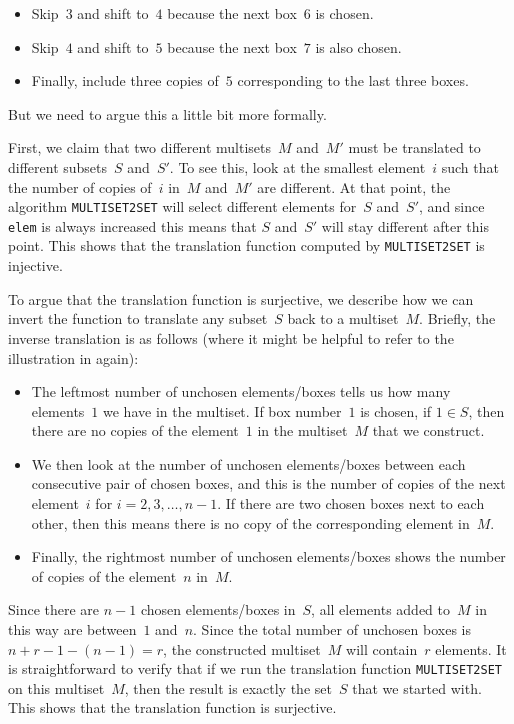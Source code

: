 \documentclass{jn-pset}
\begin{document}
\begin{problem}
\begin{solution}
\begin{itemize}
  \item
    Skip~$3$ and shift to~$4$
    because the next box~$6$ is chosen.
    
  \item
    Skip~$4$ and shift to~$5$
    because the next box~$7$ is also chosen.
    
  \item
    Finally, include three copies of~$5$
    corresponding to the last three boxes.
  \end{itemize}
%
  But we need to argue this a little bit more formally.

  First, we claim that two different multisets~$M$ and~$M'$
  must be translated to different subsets~$S$ and~$S'$.
  To see this, look at the smallest element~$i$
  such that the number of copies of~$i$ in~$M$ and~$M'$
  are different.
  At that point, the  algorithm
  \verb+MULTISET2SET+
  will select different elements for~$S$ and~$S'$,
  and since
  \verb+elem+ is always increased this means that
  $S$ and~$S'$
  will stay different after this point.
  This shows that the translation function computed by
  \verb+MULTISET2SET+
  is injective.

  To argue that the translation function is surjective,
  we describe how we can invert the function to  translate any
  subset~$S$ back to a multiset~$M$.
  Briefly, the inverse translation is as follows
  (where it might be helpful to refer to the illustration in
  again):
  \begin{itemize}
  \item
    The leftmost number of unchosen elements/boxes tells us how many elements~$1$ we
    have in the multiset.
    If box number~$1$ is chosen, \ie if
    $1 \in S$, then there are no copies of the element~$1$ in the
    multiset~$M$
    that we construct.
    
  \item
    We then look at the number of unchosen elements/boxes between each
    consecutive pair of chosen boxes,
    and this is the number of copies of the next element~$i$
    for
    $i = 2, 3, \ldots, n-1$.
    If there are two chosen boxes next to each other, then this means
    there is no copy of the corresponding element in~$M$.
 
    
  \item
    Finally, the rightmost number of unchosen elements/boxes
    shows the number of copies of the element~$n$ in~$M$.
    
  \end{itemize}
%
  Since there are $n-1$ chosen elements/boxes in~$S$, all elements
  added to~$M$ in this way are between~$1$ and~$n$.
  Since the total number of unchosen boxes is
  $
  n + r - 1 - (n-1) = r
  $,
  the constructed multiset~$M$ will contain~$r$ elements.
  It is straightforward to verify that if we run the translation function
  \verb+MULTISET2SET+
  on this multiset~$M$, then the result is exactly the set~$S$ that we
  started with. This shows that the translation function is surjective.


\end{solution}
\end{problem}
\end{document}
